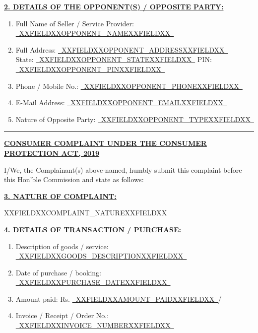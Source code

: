 \documentclass[12pt,a4paper]{article}
\newcommand{\fillline}[1]{\underline{~#1~}}
\begin{document}
\vspace{1em}

\noindent\textbf{\uline{2. DETAILS OF THE OPPONENT(S) / OPPOSITE PARTY:}}

\vspace{0.3em}
\begin{enumerate}[label=\Alph*., itemsep=0.5em]
    \item Full Name of Seller / Service Provider: \fillline{XXFIELDXXOPPONENT_NAMEXXFIELDXX}
    \item Full Address: \fillline{XXFIELDXXOPPONENT_ADDRESSXXFIELDXX}\\
          State: \fillline{XXFIELDXXOPPONENT_STATEXXFIELDXX} \quad PIN: \fillline{XXFIELDXXOPPONENT_PINXXFIELDXX}
    \item Phone / Mobile No.: \fillline{XXFIELDXXOPPONENT_PHONEXXFIELDXX}
    \item E-Mail Address: \fillline{XXFIELDXXOPPONENT_EMAILXXFIELDXX}
    \item Nature of Opposite Party: \fillline{XXFIELDXXOPPONENT_TYPEXXFIELDXX}
\end{enumerate}

\vspace{1em}
\rule{\linewidth}{0.4pt}

\begin{center}
    \uline{\textbf{CONSUMER COMPLAINT UNDER THE CONSUMER PROTECTION ACT, 2019}}
\end{center}

\vspace{0.5em}

\noindent I/We, the Complainant(s) above-named, humbly submit this complaint
before this Hon'ble Commission and state as follows:

\vspace{1em}

\noindent\textbf{\uline{3. NATURE OF COMPLAINT:}}

\vspace{0.3em}
\noindent XXFIELDXXCOMPLAINT_NATUREXXFIELDXX

\vspace{1em}

\noindent\textbf{\uline{4. DETAILS OF TRANSACTION / PURCHASE:}}

\begin{enumerate}[label=(\alph*), itemsep=0.4em]
    \item Description of goods / service: \fillline{XXFIELDXXGOODS_DESCRIPTIONXXFIELDXX}
    \item Date of purchase / booking: \fillline{XXFIELDXXPURCHASE_DATEXXFIELDXX}
    \item Amount paid: Rs. \fillline{XXFIELDXXAMOUNT_PAIDXXFIELDXX}/-
    \item Invoice / Receipt / Order No.: \fillline{XXFIELDXXINVOICE_NUMBERXXFIELDXX}
\end{enumerate}
\end{document}
